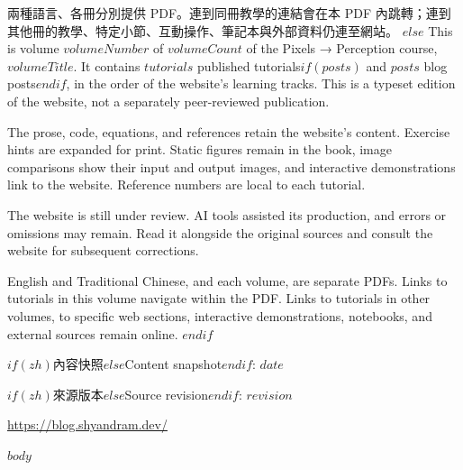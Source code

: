 \documentclass[11pt,oneside,openany]{book}
\begin{document}
兩種語言、各冊分別提供 PDF。連到同冊教學的連結會在本 PDF 內跳轉；連到其他冊的教學、特定小節、互動操作、筆記本與外部資料仍連至網站。
$else$
This is volume $volumeNumber$ of $volumeCount$ of the Pixels → Perception course, \emph{$volumeTitle$}. It contains $tutorials$ published tutorials$if(posts)$ and $posts$ blog posts$endif$, in the order of the website's learning tracks. This is a typeset edition of the website, not a separately peer-reviewed publication.

The prose, code, equations, and references retain the website's content. Exercise hints are expanded for print. Static figures remain in the book, image comparisons show their input and output images, and interactive demonstrations link to the website. Reference numbers are local to each tutorial.

The website is still under review. AI tools assisted its production, and errors or omissions may remain. Read it alongside the original sources and consult the website for subsequent corrections.

English and Traditional Chinese, and each volume, are separate PDFs. Links to tutorials in this volume navigate within the PDF. Links to tutorials in other volumes, to specific web sections, interactive demonstrations, notebooks, and external sources remain online.
$endif$
\bigskip
{\small\sffamily $if(zh)$內容快照$else$Content snapshot$endif$: $date$\par
$if(zh)$來源版本$else$Source revision$endif$: \texttt{$revision$}\par
\url{https://blog.shyandram.dev/}}
\tableofcontents
\mainmatter
$body$
\end{document}
